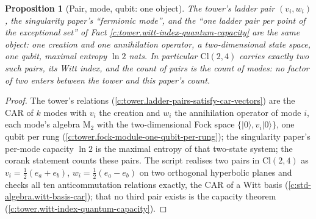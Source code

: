 \documentclass[11pt]{article}
\newtheorem{proposition}[theorem]{Proposition}
\theoremstyle{definition}
\theoremstyle{plain}
\newcommand{\changedmark}[2]{\marginpar{\raggedright\scriptsize\color{#1}#2}}
\providecommand{\Cl}{}\renewcommand{\Cl}{\mathrm{Cl}}
\providecommand{\Mat}{}\renewcommand{\Mat}{\mathrm{M}}
\begin{document}
\begin{proposition}[Pair, mode, qubit: one object]\label{c:scrambling.pair-mode-qubit-one-object}
\changedmark{gray}{reworded}
The tower's ladder pair $(v_i, w_i)$, the singularity paper's ``fermionic mode'', and the ``one ladder pair per point of the exceptional set'' of Fact \ref{c:tower.witt-index-quantum-capacity} are the same object: one creation and one annihilation operator, a two-dimensional state space, one qubit, maximal entropy $\ln 2$ nats. In particular $\Cl(2,4)$ carries exactly two such pairs, its Witt index, and the count of pairs is the count of modes: no factor of two enters between the tower and this paper's count.
\end{proposition}
\begin{proof}
The tower's relations \cite[Prop.~4.1]{ButlerT3} (\ref{c:tower.ladder-pairs-satisfy-car-vectors}) are the CAR of $k$ modes with $v_i$ the creation and $w_i$ the annihilation operator of mode $i$, each mode's algebra $\Mat_2$ with the two-dimensional Fock space $\{|0\rangle, v_i|0\rangle\}$, one qubit per rung \cite[Thm.~4.2]{ButlerT3} (\ref{c:tower.fock-module-one-qubit-per-rung}); the singularity paper's per-mode capacity $\ln 2$ is the maximal entropy of that two-state system; the corank statement counts these pairs. The script realises two pairs in $\Cl(2,4)$ as $v_i = \tfrac12(e_a + e_b)$, $w_i = \tfrac12(e_a - e_b)$ on two orthogonal hyperbolic planes and checks all ten anticommutation relations exactly, the CAR of a Witt basis (\ref{c:std-algebra.witt-basis-car}); that no third pair exists is the capacity theorem \cite[Thm.~4.3]{ButlerT3} (\ref{c:tower.witt-index-quantum-capacity}).

\end{proof}
\end{document}
